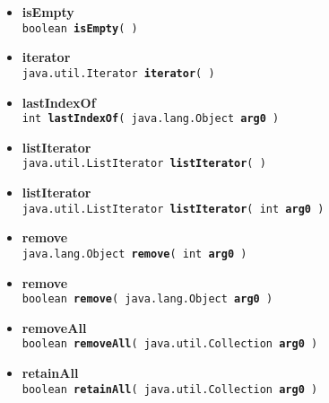 {{{\begin{itemize}
{{\tt  int\ {\bf indexOf}( {\tt java.lang.Object} {\bf arg0} )
\label{amber.showoff.ObservableList.indexOf(java.lang.Object)}}%
}%
 \item{ 
{\bf isEmpty}\\
{\tt  boolean\ {\bf isEmpty}(  )
\label{amber.showoff.ObservableList.isEmpty()}}%
}%
 \item{ 
{\bf iterator}\\
{\tt  java.util.Iterator\ {\bf iterator}(  )
\label{amber.showoff.ObservableList.iterator()}}%
}%
 \item{ 
{\bf lastIndexOf}\\
{\tt  int\ {\bf lastIndexOf}( {\tt java.lang.Object} {\bf arg0} )
\label{amber.showoff.ObservableList.lastIndexOf(java.lang.Object)}}%
}%
 \item{ 
{\bf listIterator}\\
{\tt  java.util.ListIterator\ {\bf listIterator}(  )
\label{amber.showoff.ObservableList.listIterator()}}%
}%
 \item{ 
{\bf listIterator}\\
{\tt  java.util.ListIterator\ {\bf listIterator}( {\tt int} {\bf arg0} )
\label{amber.showoff.ObservableList.listIterator(int)}}%
}%
 \item{ 
{\bf remove}\\
{\tt  java.lang.Object\ {\bf remove}( {\tt int} {\bf arg0} )
\label{amber.showoff.ObservableList.remove(int)}}%
}%
 \item{ 
{\bf remove}\\
{\tt  boolean\ {\bf remove}( {\tt java.lang.Object} {\bf arg0} )
\label{amber.showoff.ObservableList.remove(java.lang.Object)}}%
}%
 \item{ 
{\bf removeAll}\\
{\tt  boolean\ {\bf removeAll}( {\tt java.util.Collection} {\bf arg0} )
\label{amber.showoff.ObservableList.removeAll(java.util.Collection)}}%
}%
 \item{ 
{\bf retainAll}\\
{\tt  boolean\ {\bf retainAll}( {\tt java.util.Collection} {\bf arg0} )
\label{amber.showoff.ObservableList.retainAll(java.util.Collection)}}%
}
\end{itemize}}}}
